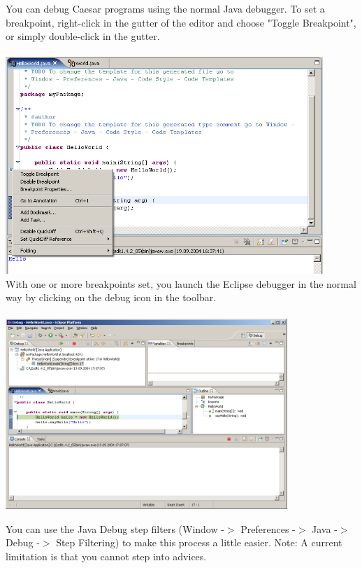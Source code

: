 You can debug Caesar programs using the normal Java debugger. To set a breakpoint, right-click in the gutter of the editor and choose "Toggle Breakpoint", or simply double-click in the gutter.\\\\
\includegraphics[width=0.90\textwidth]{images/brake_point.png}\\

With one or more breakpoints set, you launch the Eclipse debugger in the normal way by clicking on the debug icon in the toolbar.\\\\
\includegraphics[width=0.80\textwidth]{images/debug1.png}\newpage

You can use the Java Debug step filters (Window -$>$ Preferences -$>$ Java -$>$ Debug -$>$ Step Filtering) to make this process a little easier.
Note: A current limitation is that you cannot step into advices.